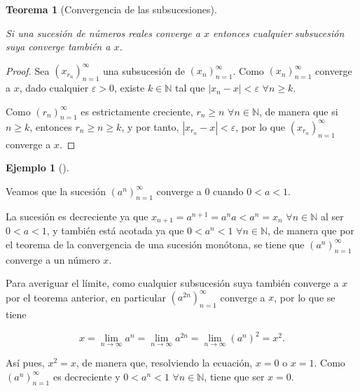 \documentclass[
  a4paper,
]{scrreport}
\theoremstyle{definition}
\newtheorem{example}{Ejemplo}[chapter]
\theoremstyle{plain}
\theoremstyle{definition}
\theoremstyle{plain}
\newtheorem{theorem}{Teorema}[chapter]
\theoremstyle{plain}
\theoremstyle{remark}
\begin{document}
\leavevmode{}%
\begin{theorem}[Convergencia de las
subsucesiones]\label{thm-convergencia-subsucesiones}

Si una sucesión de números reales converge a \(x\) entonces cualquier
subsucesión suya converge también a \(x\).

\end{theorem}

\begin{tcolorbox}[enhanced jigsaw, breakable, arc=.35mm, colbacktitle=quarto-callout-note-color!10!white, toptitle=1mm, opacityback=0, colframe=quarto-callout-note-color-frame, colback=white, left=2mm, bottomrule=.15mm, opacitybacktitle=0.6, title=\textcolor{quarto-callout-note-color}{\faInfo}\hspace{0.5em}{Demostración}, toprule=.15mm, titlerule=0mm, coltitle=black, rightrule=.15mm, bottomtitle=1mm, leftrule=.75mm]

\begin{proof}

Sea \((x_{r_n})_{n=1}^\infty\) una subsucesión de
\((x_n)_{n=1}^\infty\). Como \((x_n)_{n=1}^\infty\) converge a \(x\),
dado cualquier \(\varepsilon>0\), existe \(k\in\mathbb{N}\) tal que
\(|x_n-x|<\varepsilon\) \(\forall n\geq k\).

Como \((r_n)_{n=1}^\infty\) es estrictamente creciente, \(r_n\geq n\)
\(\forall n\in\mathbb{N}\), de manera que si \(n\geq k\), entonces
\(r_n\geq n\geq k\), y por tanto, \(|x_{r_n}-x|<\varepsilon\), por lo
que \((x_{r_n})_{n=1}^\infty\) converge a \(x\).

\end{proof}

\end{tcolorbox}

\leavevmode{}%
\begin{example}[]\label{exm-subsucesiones-convergentes}

Veamos que la sucesión \((a^n)_{n=1}^\infty\) converge a \(0\) cuando
\(0<a<1\).

La sucesión es decreciente ya que \(x_{n+1}=a^{n+1}=a^na<a^n=x_n\)
\(\forall n\in\mathbb{N}\) al ser \(0<a<1\), y también está acotada ya
que \(0<a^n<1\) \(\forall n\in\mathbb{N}\), de manera que por el teorema
de la convergencia de una sucesión monótona, se tiene que
\((a^n)_{n=1}^\infty\) converge a un número \(x\).

Para averiguar el límite, como cualquier subsucesión suya también
converge a \(x\) por el teorema anterior, en particular
\((a^{2n})_{n=1}^\infty\) converge a \(x\), por lo que se tiene

\[ 
x = \lim_{n\to\infty} a^n = \lim_{n\to\infty} a^{2n} = \lim_{n\to\infty} (a^n)^2 = x^2.
\]

Así pues, \(x^2=x\), de manera que, resolviendo la ecuación, \(x=0\) o
\(x=1\). Como \((a^n)_{n=1}^\infty\) es decreciente y \(0<a^n<1\)
\(\forall n\in\mathbb{N}\), tiene que ser \(x=0\).

\end{example}
\end{document}
